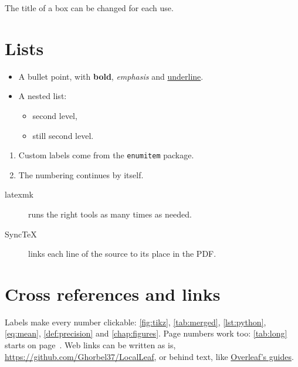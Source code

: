 \begin{warningbox}[Careful]
  The title of a box can be changed for each use.
\end{warningbox}

\section{Lists}

\begin{itemize}
  \item A bullet point, with \textbf{bold}, \emph{emphasis} and \underline{underline}.
  \item A nested list:
  \begin{itemize}
    \item second level,
    \item still second level.
  \end{itemize}
\end{itemize}

\begin{enumerate}[label=\textbf{Step \arabic*.}, leftmargin=*]
  \item Custom labels come from the \texttt{enumitem} package.
  \item The numbering continues by itself.
\end{enumerate}

\begin{description}
  \item[latexmk] runs the right tools as many times as needed.
  \item[SyncTeX] links each line of the source to its place in the \ac{PDF}.
\end{description}

\section{Cross references and links}

Labels make every number clickable: \cref{fig:tikz}, \cref{tab:merged},
\cref{lst:python}, \cref{eq:mean}, \cref{def:precision} and
\cref{chap:figures}. Page numbers work too: \cref{tab:long} starts on
page~\pageref{tab:long}. Web links can be written as is,
\url{https://github.com/Ghorbel37/LocalLeaf}, or behind text, like
\href{https://www.overleaf.com/learn}{Overleaf's guides}.
